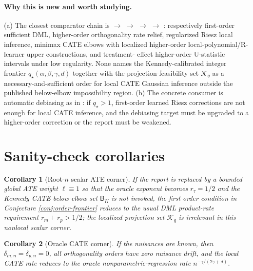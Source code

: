 \documentclass[11pt]{article}
\theoremstyle{definition}
\theoremstyle{plain}
\newtheorem{corollary}{Corollary}
\theoremstyle{remark}
\begin{document}
\paragraph{Why this is new and worth studying.}
(a) The closest comparator chain is
\citet[\S3, especially the orthogonal-score product-rate condition]{ChernozhukovEtAl2018DML}
\(\to\)
\citet[\S2.1, \S3.1, Corollary 4]{MackeySyrgkanisZadik2018OML} \(\to\)
\citet[\S2--\S3 on regularized Riesz local functionals]{ChernozhukovNeweySingh2022Riesz}
\(\to\)
\citet[\S2--\S4 and Theorems 1--2]{KennedyBalakrishnanRobinsWasserman2024MinimaxCATE}
\(\to\)
\citet{LiTchetgenVanDerVaartRobins2011HOIFTreatment}:
respectively first-order sufficient DML, higher-order orthogonality rate
relief, regularized Riesz local inference, minimax CATE elbows with localized
higher-order local-polynomial/R-learner upper constructions, and treatment-
effect higher-order U-statistic intervals under low regularity.  None names
the Kennedy-calibrated integer frontier
\(q_\star(\alpha,\beta,\gamma,d)\) together with the projection-feasibility
set \(\mathcal K_q\) as a necessary-and-sufficient order for local CATE
Gaussian inference outside the published below-elbow impossibility region.
(b) The concrete consumer is
automatic debiasing as in \citet{ChernozhukovNeweySingh2022AutoDML}: if
\(q_\star>1\), first-order learned Riesz corrections are not enough for local
CATE inference, and the debiasing target must be upgraded to a higher-order
correction or the report must be weakened.

\section{Sanity-check corollaries}
\begin{corollary}[Root-\(n\) scalar ATE corner]\label{cor:ate-corner}
If the report is replaced by a bounded global ATE weight \(\ell\equiv1\) so
that the oracle exponent becomes \(r_\tau=1/2\) and the Kennedy CATE
below-elbow set \(\mathsf B_K\) is not invoked, the first-order condition in
Conjecture \ref{conj:order-frontier} reduces to the usual DML product-rate
requirement \(r_m+r_p>1/2\); the localized projection set \(\mathcal K_q\) is
irrelevant in this nonlocal scalar corner.
\end{corollary}

\begin{corollary}[Oracle CATE corner]\label{cor:oracle-corner}
If the nuisances are known, then \(\delta_{m,n}=\delta_{p,n}=0\), all
orthogonality orders have zero nuisance drift, and the local CATE rate reduces
to the oracle nonparametric-regression rate \(n^{-\gamma/(2\gamma+d)}\).
\end{corollary}
\end{document}
